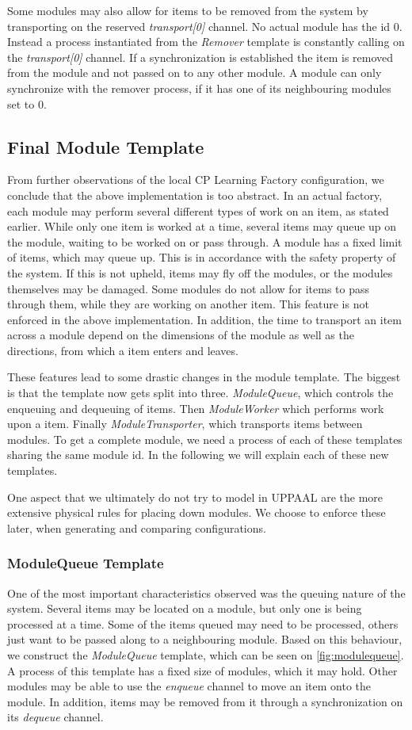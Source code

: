 Some modules may also allow for items to be removed from the system by transporting on the reserved \emph{transport[0]} channel. No actual module has the id 0. Instead a process instantiated from the \emph{Remover} template is constantly calling on the \emph{transport[0]} channel. If a synchronization is established the item is removed from the module and not passed on to any other module. A module can only synchronize with the remover process, if it has one of its neighbouring modules set to 0. 

\subsection{Final Module Template}
From further observations of the local CP Learning Factory configuration, we conclude that the above implementation is too abstract. In an actual factory, each module may perform several different types of work on an item, as stated earlier. While only one item is worked at a time, several items may queue up on the module, waiting to be worked on or pass through. A module has a fixed limit of items, which may queue up. This is in accordance with the safety property of the system. If this is not upheld, items may fly off the modules, or the modules themselves may be damaged. Some modules do not allow for items to pass through them, while they are working on another item. This feature is not enforced in the above implementation. In addition, the time to transport an item across a module depend on the dimensions of the module as well as the directions, from which a item enters and leaves.

These features lead to some drastic changes in the module template. The biggest is that the template now gets split into three. \emph{ModuleQueue}, which controls the enqueuing and dequeuing of items. Then \emph{ModuleWorker} which performs work upon a item. Finally \emph{ModuleTransporter}, which transports items between modules. To get a complete module, we need a process of each of these templates sharing the same module id. In the following we will explain each of these new templates.

One aspect that we ultimately do not try to model in UPPAAL are the more extensive physical rules for placing down modules. We choose to enforce these later, when generating and comparing configurations. 

\subsubsection{ModuleQueue Template}\label{subs:modulequeue}
One of the most important characteristics observed was the queuing nature of the system. Several items may be located on a module, but only one is being processed at a time. Some of the items queued may need to be processed, others just want to be passed along to a neighbouring module. Based on this behaviour, we construct the \emph{ModuleQueue} template, which can be seen on \cref{fig:modulequeue}. A process of this template has a fixed size of modules, which it may hold. Other modules may be able to use the \emph{enqueue} channel to move an item onto the module. In addition, items may be removed from it through a synchronization on its \emph{dequeue} channel.

